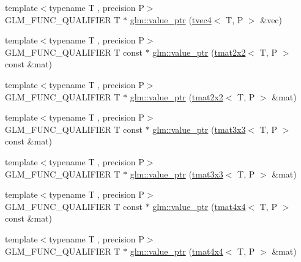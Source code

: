\begin{DoxyCompactItemize}
\item 
{\footnotesize template$<$typename T , precision P$>$ }\\G\+L\+M\+\_\+\+F\+U\+N\+C\+\_\+\+Q\+U\+A\+L\+I\+F\+I\+ER T $\ast$ \hyperlink{group__gtc__type__ptr_ga4c19763f3c5991b9dc88a3ffdd9ea6cd}{glm\+::value\+\_\+ptr} (\hyperlink{structglm_1_1tvec4}{tvec4}$<$ T, P $>$ \&vec)
\item 
{\footnotesize template$<$typename T , precision P$>$ }\\G\+L\+M\+\_\+\+F\+U\+N\+C\+\_\+\+Q\+U\+A\+L\+I\+F\+I\+ER T const  $\ast$ \hyperlink{group__gtc__type__ptr_ga2d709523aa0beb0a42433f80c9d07718}{glm\+::value\+\_\+ptr} (\hyperlink{structglm_1_1tmat2x2}{tmat2x2}$<$ T, P $>$ const \&mat)
\item 
{\footnotesize template$<$typename T , precision P$>$ }\\G\+L\+M\+\_\+\+F\+U\+N\+C\+\_\+\+Q\+U\+A\+L\+I\+F\+I\+ER T $\ast$ \hyperlink{group__gtc__type__ptr_gac7256e14328e818e61276fa5e6176b9d}{glm\+::value\+\_\+ptr} (\hyperlink{structglm_1_1tmat2x2}{tmat2x2}$<$ T, P $>$ \&mat)
\item 
{\footnotesize template$<$typename T , precision P$>$ }\\G\+L\+M\+\_\+\+F\+U\+N\+C\+\_\+\+Q\+U\+A\+L\+I\+F\+I\+ER T const  $\ast$ \hyperlink{group__gtc__type__ptr_ga0fd20ac385befba86cf2bbf836728bc2}{glm\+::value\+\_\+ptr} (\hyperlink{structglm_1_1tmat3x3}{tmat3x3}$<$ T, P $>$ const \&mat)
\item 
{\footnotesize template$<$typename T , precision P$>$ }\\G\+L\+M\+\_\+\+F\+U\+N\+C\+\_\+\+Q\+U\+A\+L\+I\+F\+I\+ER T $\ast$ \hyperlink{group__gtc__type__ptr_ga4470e16d0e844cb2c4f7b2e731824f87}{glm\+::value\+\_\+ptr} (\hyperlink{structglm_1_1tmat3x3}{tmat3x3}$<$ T, P $>$ \&mat)
\item 
{\footnotesize template$<$typename T , precision P$>$ }\\G\+L\+M\+\_\+\+F\+U\+N\+C\+\_\+\+Q\+U\+A\+L\+I\+F\+I\+ER T const  $\ast$ \hyperlink{group__gtc__type__ptr_ga2edadf5433694bf018d62db962b61321}{glm\+::value\+\_\+ptr} (\hyperlink{structglm_1_1tmat4x4}{tmat4x4}$<$ T, P $>$ const \&mat)
\item 
{\footnotesize template$<$typename T , precision P$>$ }\\G\+L\+M\+\_\+\+F\+U\+N\+C\+\_\+\+Q\+U\+A\+L\+I\+F\+I\+ER T $\ast$ \hyperlink{group__gtc__type__ptr_ga1fc49ab60e5afdd4821a6903e92244a4}{glm\+::value\+\_\+ptr} (\hyperlink{structglm_1_1tmat4x4}{tmat4x4}$<$ T, P $>$ \&mat)
\item 

\end{DoxyCompactItemize}

